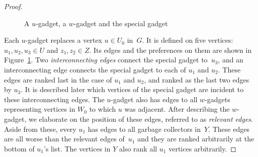 \documentclass[preprint,12pt]{elsarticle}
\begin{document}
\begin{proof}
\begin{figure}[h]
\begin{minipage}{0.3\textwidth}
\end{minipage}
\caption{A $u$-gadget, a $w$-gadget and the special gadget}
\label{fi:gadgets_q1}
\end{figure}


	Each $u$-gadget replaces a vertex $u \in U_0$ in~$G$. It is defined on five vertices: $u_1, u_2, u_3 \in U$ and $z_1, z_2 \in Z$. Its edges and the preferences on them are shown in Figure~\ref{fi:gadgets_q1}. Two \emph{interconnecting edges} connect the special gadget to~$u_3$, and an interconnecting edge connects the special gadget to each of $u_1$ and $u_2$.  These edges are ranked last in the case of $u_1$ and $u_2$, and ranked as the last two edges by $u_3$. It is described later which vertices of the special gadget are incident to these interconnecting edges. The $u$-gadget also has edges to all $w$-gadgets representing vertices in $W_0$ to which $u$ was adjacent. After describing the $w$-gadget, we elaborate on the position of these edges, referred to as \emph{relevant edges}. Aside from these, every $u_1$ has edges to all garbage collectors in~$Y$. These edges are all worse than the relevant edges of~$u_1$ and they are ranked arbitrarily at the bottom of $u_1$'s list. The vertices in $Y$ also rank all $u_1$ vertices arbitrarily.
	

\end{proof}
\end{document}
